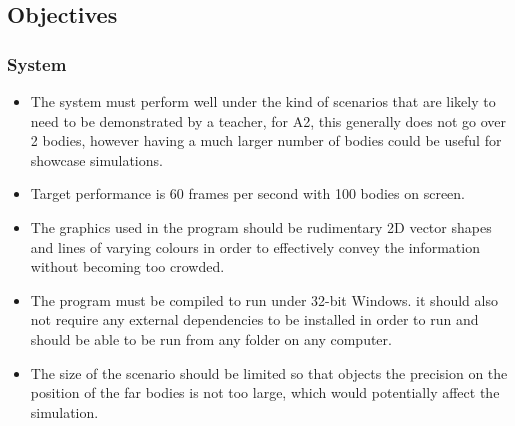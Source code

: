 \subsection{Objectives}

\subsubsection{System}
\begin{itemize}
\item The system must perform well under the kind of scenarios that are likely to need to be demonstrated by a teacher, for A2, this generally does not go over 2 bodies, however having a much larger number of bodies could be useful for showcase simulations.
\item Target performance is 60 frames per second with 100 bodies on screen.
\item The graphics used in the program should be rudimentary 2D vector shapes and lines of varying colours in order to effectively convey the information without becoming too crowded.
\item The program must be compiled to run under 32-bit Windows. it should also not require any external dependencies to be installed in order to run and should be able to be run from any folder on any computer.
\item The size of the scenario should be limited so that objects the precision on the position of the far bodies is not too large, which would potentially affect the simulation.
\end{itemize}


